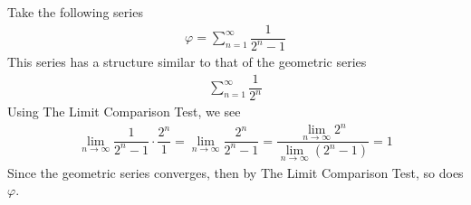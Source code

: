 \begin{example}
Take the following series
\begin{align*}
    \varphi = \sum_{n = 1}^{\infty} \dfrac{1}{2^{n} - 1}
\end{align*}
This series has a structure similar to that of the geometric series
\begin{align*}
    \sum_{n = 1}^{\infty} \dfrac{1}{2^{n}}
\end{align*}
Using The Limit Comparison Test, we see
\begin{align*}
    \lim_{n \longrightarrow \infty} \dfrac{1}{2^{n} - 1} \cdot \dfrac{2^{n}}{1} = \lim_{n \longrightarrow \infty} \dfrac{2^{n}}{2^{n} - 1} = \dfrac{\lim_{n \longrightarrow \infty} 2^{n}}{\lim_{n \longrightarrow \infty} (2^{n} - 1)} = 1
\end{align*}
Since the geometric series converges, then by The Limit Comparison Test, so does $\varphi$.
\end{example}

